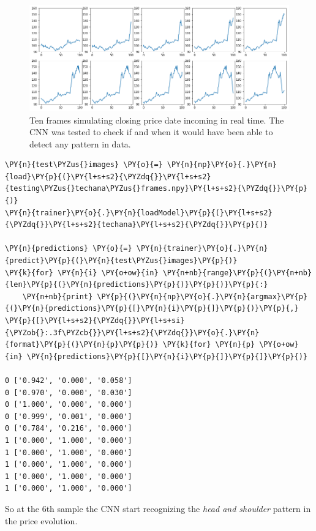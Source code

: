 \begin{figure}
	\centering
	\includegraphics[width=\textwidth]{figures/tech_ana_frames.png}
	\caption{Ten frames simulating closing price date incoming in real time. The CNN was tested to check if and when it would have been able to detect any pattern in data.}
	\label{fig:frame_simulation}
\end{figure}


\begin{tcolorbox}[breakable, size=fbox, boxrule=1pt, pad at break*=1mm,colback=cellbackground, colframe=cellborder]
\begin{Verbatim}[commandchars=\\\{\}]
\PY{n}{test\PYZus{}images} \PY{o}{=} \PY{n}{np}\PY{o}{.}\PY{n}{load}\PY{p}{(}\PY{l+s+s2}{\PYZdq{}}\PY{l+s+s2}{testing\PYZus{}techana\PYZus{}frames.npy}\PY{l+s+s2}{\PYZdq{}}\PY{p}{)}
\PY{n}{trainer}\PY{o}{.}\PY{n}{loadModel}\PY{p}{(}\PY{l+s+s2}{\PYZdq{}}\PY{l+s+s2}{techana}\PY{l+s+s2}{\PYZdq{}}\PY{p}{)}
	
\PY{n}{predictions} \PY{o}{=} \PY{n}{trainer}\PY{o}{.}\PY{n}{predict}\PY{p}{(}\PY{n}{test\PYZus{}images}\PY{p}{)}
\PY{k}{for} \PY{n}{i} \PY{o+ow}{in} \PY{n+nb}{range}\PY{p}{(}\PY{n+nb}{len}\PY{p}{(}\PY{n}{predictions}\PY{p}{)}\PY{p}{)}\PY{p}{:}
    \PY{n+nb}{print} \PY{p}{(}\PY{n}{np}\PY{o}{.}\PY{n}{argmax}\PY{p}{(}\PY{n}{predictions}\PY{p}{[}\PY{n}{i}\PY{p}{]}\PY{p}{)}\PY{p}{,} \PY{p}{[}\PY{l+s+s2}{\PYZdq{}}\PY{l+s+si}{\PYZob{}:.3f\PYZcb{}}\PY{l+s+s2}{\PYZdq{}}\PY{o}{.}\PY{n}{format}\PY{p}{(}\PY{n}{p}\PY{p}{)} \PY{k}{for} \PY{n}{p} \PY{o+ow}{in} \PY{n}{predictions}\PY{p}{[}\PY{n}{i}\PY{p}{]}\PY{p}{]}\PY{p}{)}

0 ['0.942', '0.000', '0.058']
0 ['0.970', '0.000', '0.030']
0 ['1.000', '0.000', '0.000']
0 ['0.999', '0.001', '0.000']
0 ['0.784', '0.216', '0.000']
1 ['0.000', '1.000', '0.000']
1 ['0.000', '1.000', '0.000']
1 ['0.000', '1.000', '0.000']
1 ['0.000', '1.000', '0.000']
1 ['0.000', '1.000', '0.000']
\end{Verbatim}
\end{tcolorbox}

So at the 6th sample the CNN start recognizing the \emph{head and
shoulder} pattern in the price evolution.

